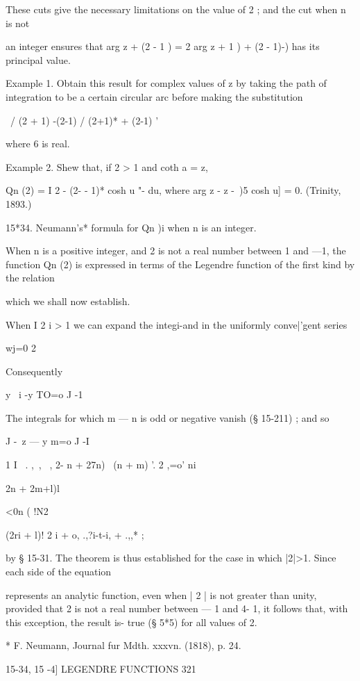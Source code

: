 {{These cuts give the necessary limitations on the value of 2 ; and the
cut when n is not

an integer ensures that arg z + (2 - 1 ) = 2 arg z + 1 ) + (2 - 1)-)
has its principal value.

Example 1. Obtain this result for complex values of z by taking the
path of integration to be a certain circular arc before making the
substitution

 \ / (2 + 1) -(2-1) / (2+1)* + (2-1) '

where 6 is real.

Example 2. Shew that, if 2 > 1 and coth a = z,

Qn (2) = I 2 - (2- - 1)* cosh u "- du, where arg z - z -\ )5 cosh u] =
0. (Trinity, 1893.)

15*34. Neumann's* formula for Qn )i when n is an integer.

When n is a positive integer, and 2 is not a real number between 1 and
—1, the function Qn (2) is expressed in terms of the Legendre function
of the first kind by the relation

which we shall now establish.

When I 2 i > 1 we can expand the integi-and in the uniformly
conve|'gent series



wj=0 2

Consequently

 y \ i -y TO=o J -1

The integrals for which m — n is odd or negative vanish (§ 15-211) ;
and so

  J -\ z — y m=o J -I

 1 I \ . ,\ , \ , 2- n + 27n) \ (n + m) '. 2 ,=o' ni\ \ {2n + 2m+l)l

<0n ( !N2

(2ri + l)! 2 i + o, .,?i-t-i, + .,,* ;



by § 15-31. The theorem is thus established for the case in which
|2|>1. Since each side of the equation

represents an analytic function, even when | 2 | is not greater than
unity, provided that 2 is not a real number between — 1 and 4- 1, it
follows that, with this exception, the result is- true (§ 5*5) for all
values of 2.

* F. Neumann, Journal fur Mdth. xxxvn. (1818), p. 24.



15-34, 15 -4] LEGENDRE FUNCTIONS 321

}}}

